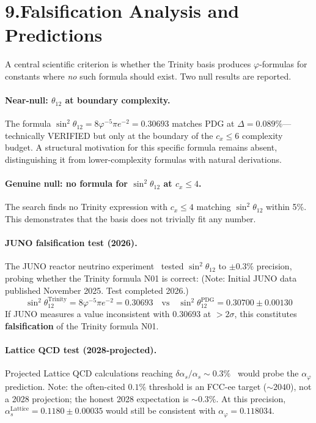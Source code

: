 \documentclass[10pt,a4paper]{article}
\begin{document}
\section*{9.\quad Falsification Analysis and Predictions}

A central scientific criterion is whether the Trinity basis produces $\varphi$-formulas for
constants where \emph{no} such formula should exist. Two null results are reported.

\paragraph{Near-null: $\theta_{12}$ at boundary complexity.}
The formula $\sin^2\theta_{12} = 8\varphi^{-5}\pi e^{-2} = 0.30693$ matches PDG at $\Delta = 0.089\%$---
technically VERIFIED but only at the boundary of the $c_x \le 6$ complexity budget.
A structural motivation for this specific formula remains absent, distinguishing it from
lower-complexity formulas with natural derivations.

\paragraph{Genuine null: no formula for $\sin^2\theta_{12}$ at $c_x \le 4$.}
The search finds no Trinity expression with $c_x \le 4$ matching $\sin^2\theta_{12}$ within 5\%.
This demonstrates that the basis does not trivially fit any number.

\paragraph{JUNO falsification test (2026).}
The JUNO reactor neutrino experiment~\cite{juno2022} tested $\sin^2\theta_{12}$ to $\pm 0.3\%$
precision, probing whether the Trinity formula N01 is correct:
(Note: Initial JUNO data published November 2025. Test completed 2026.)
\begin{equation}
  \sin^2\theta_{12}^{\mathrm{Trinity}} = 8\varphi^{-5}\pi e^{-2} = 0.30693
  \quad \text{vs} \quad \sin^2\theta_{12}^{\mathrm{PDG}} = 0.30700 \pm 0.00130
  \label{eq:juno}
\end{equation}
If JUNO measures a value inconsistent with 0.30693 at $> 2\sigma$, this constitutes
\textbf{falsification} of the Trinity formula N01.

\paragraph{Lattice QCD test (2028-projected).}
Projected Lattice QCD calculations reaching $\delta\alpha_s/\alpha_s \sim 0.3\%$~\cite{latticeQCD2024}
would probe the $\alpha_\varphi$ prediction. Note: the often-cited $0.1\%$ threshold is an
FCC-ee target ($\sim 2040$), not a 2028 projection; the honest 2028 expectation is $\sim 0.3\%$.
At this precision, $\alpha_s^{\mathrm{Lattice}} = 0.1180 \pm 0.00035$ would still be consistent
with $\alpha_\varphi = 0.118034$.
\end{document}
